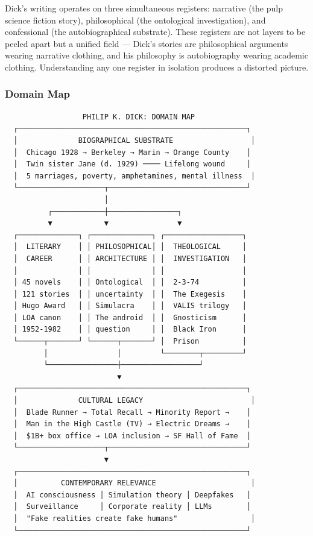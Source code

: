 \documentclass[11pt,letterpaper]{article}
\begin{document}
Dick's writing operates on three simultaneous registers: narrative (the pulp science fiction story), philosophical (the ontological investigation), and confessional (the autobiographical substrate). These registers are not layers to be peeled apart but a unified field --- Dick's stories are philosophical arguments wearing narrative clothing, and his philosophy is autobiography wearing academic clothing. Understanding any one register in isolation produces a distorted picture.

\subsubsection{Domain Map}

\begin{asciibox}
\begin{verbatim}
                  PHILIP K. DICK: DOMAIN MAP
  ┌─────────────────────────────────────────────────────┐
  │              BIOGRAPHICAL SUBSTRATE                  │
  │  Chicago 1928 → Berkeley → Marin → Orange County    │
  │  Twin sister Jane (d. 1929) ──── Lifelong wound     │
  │  5 marriages, poverty, amphetamines, mental illness  │
  └────────────────────┬────────────────────────────────┘
                       │
          ┌────────────┼────────────────┐
          ▼            ▼                ▼
  ┌──────────────┐ ┌──────────────┐ ┌──────────────────┐
  │  LITERARY    │ │ PHILOSOPHICAL│ │  THEOLOGICAL     │
  │  CAREER      │ │ ARCHITECTURE │ │  INVESTIGATION   │
  │              │ │              │ │                  │
  │ 45 novels    │ │ Ontological  │ │  2-3-74          │
  │ 121 stories  │ │ uncertainty  │ │  The Exegesis    │
  │ Hugo Award   │ │ Simulacra    │ │  VALIS trilogy   │
  │ LOA canon    │ │ The android  │ │  Gnosticism      │
  │ 1952-1982    │ │ question     │ │  Black Iron      │
  └──────┬───────┘ └──────┬───────┘ │  Prison          │
         │                │         └────────┬─────────┘
         └────────────────┼──────────────────┘
                          ▼
  ┌─────────────────────────────────────────────────────┐
  │              CULTURAL LEGACY                         │
  │  Blade Runner → Total Recall → Minority Report →    │
  │  Man in the High Castle (TV) → Electric Dreams →    │
  │  $1B+ box office → LOA inclusion → SF Hall of Fame  │
  └────────────────────┬────────────────────────────────┘
                       ▼
  ┌─────────────────────────────────────────────────────┐
  │          CONTEMPORARY RELEVANCE                      │
  │  AI consciousness │ Simulation theory │ Deepfakes   │
  │  Surveillance     │ Corporate reality │ LLMs        │
  │  "Fake realities create fake humans"                 │
  └─────────────────────────────────────────────────────┘
\end{verbatim}
\end{asciibox}
\end{document}
